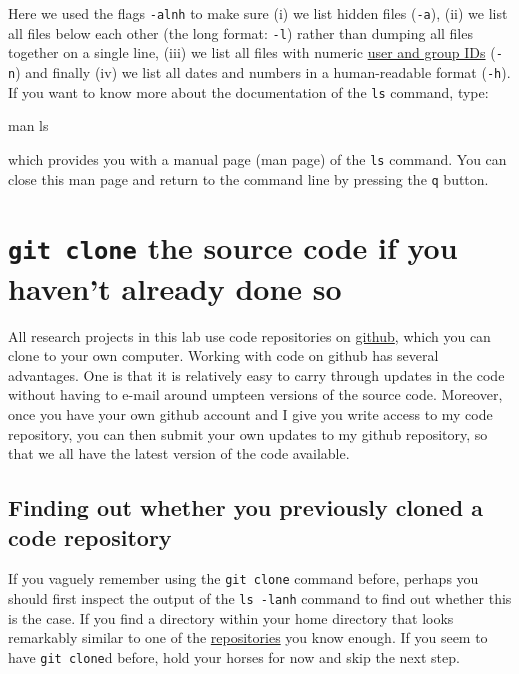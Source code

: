 \documentclass[
]{book}
\newenvironment{Shaded}{\begin{snugshade}}{\end{snugshade}}
\newcommand{\FunctionTok}[1]{\textcolor[rgb]{0.00,0.00,0.00}{#1}}
\newcommand{\NormalTok}[1]{#1}
\begin{document}
Here we used the flags \texttt{-alnh} to make sure (i) we list hidden files (\texttt{-a}), (ii) we list all files below each other (the long format: \texttt{-l}) rather than dumping all files together on a single line, (iii) we list all files with numeric \href{https://en.wikipedia.org/wiki/User_identifier}{user and group IDs} (\texttt{-n}) and finally (iv) we list all dates and numbers in a human-readable format (\texttt{-h}). If you want to know more about the documentation of the \texttt{ls} command, type:

\begin{Shaded}
\begin{Highlighting}[]
\FunctionTok{man}\NormalTok{ ls}
\end{Highlighting}
\end{Shaded}

which provides you with a manual page (man page) of the \texttt{ls} command. You can close this man page and return to the command line by pressing the \texttt{q} button.

\hypertarget{git-clone-the-source-code-if-you-havent-already-done-so}{%
\section{\texorpdfstring{\texttt{git\ clone} the source code if you haven't already done so}{git clone the source code if you haven't already done so}}\label{git-clone-the-source-code-if-you-havent-already-done-so}}

All research projects in this lab use code repositories on \href{https://github.com/bramkuijper}{github}, which you can clone to your own computer. Working with code on github has several advantages. One is that it is relatively easy to carry through updates in the code without having to e-mail around umpteen versions of the source code. Moreover, once you have your own github account and I give you write access to my code repository, you can then submit your own updates to my github repository, so that we all have the latest version of the code available.

\hypertarget{finding-out-whether-you-previously-cloned-a-code-repository}{%
\subsection{Finding out whether you previously cloned a code repository}\label{finding-out-whether-you-previously-cloned-a-code-repository}}

If you vaguely remember using the \texttt{git\ clone} command before, perhaps you should first inspect the output of the \texttt{ls\ -lanh} command to find out whether this is the case. If you find a directory within your home directory that looks remarkably similar to one of the \href{https://github.com/bramkuijper?tab=repositories}{repositories} you know enough. If you seem to have \texttt{git\ clone}d before, hold your horses for now and skip the next step.
\end{document}
